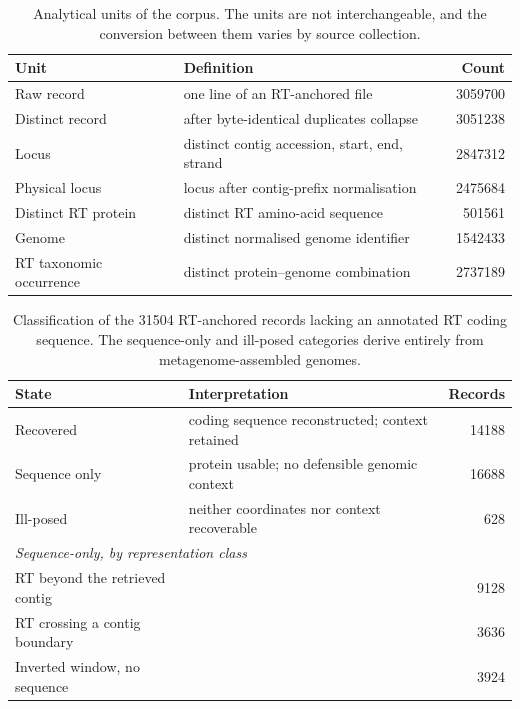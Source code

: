 \begin{table}[htbp]
\centering
\caption[Analytical units of the corpus]{Analytical units of the corpus. The units are not
interchangeable, and the conversion between them varies by source collection.}
\label{tab:units}
\begin{tabular}{llr}
\toprule
Unit & Definition & Count \\
\midrule
Raw record              & one line of an RT-anchored file                      & \num{3059700} \\
Distinct record         & after byte-identical duplicates collapse             & \num{3051238} \\
Locus                   & distinct contig accession, start, end, strand        & \num{2847312} \\
Physical locus          & locus after contig-prefix normalisation              & \num{2475684} \\
Distinct RT protein     & distinct RT amino-acid sequence                      & \num{501561}  \\
Genome                  & distinct normalised genome identifier                & \num{1542433} \\
RT taxonomic occurrence & distinct protein--genome combination                 & \num{2737189} \\
\bottomrule
\end{tabular}
\end{table}

\begin{table}[htbp]
\centering
\caption[Classification of records lacking an annotated RT coding sequence]{Classification of the
\num{31504} RT-anchored records lacking an annotated RT coding sequence. The sequence-only and
ill-posed categories derive entirely from metagenome-assembled genomes.}
\label{tab:recovery}
\begin{tabular}{llr}
\toprule
State & Interpretation & Records \\
\midrule
Recovered     & coding sequence reconstructed; context retained & \num{14188} \\
Sequence only & protein usable; no defensible genomic context   & \num{16688} \\
Ill-posed     & neither coordinates nor context recoverable     & 628 \\
\midrule
\multicolumn{2}{l}{\emph{Sequence-only, by representation class}} & \\
\quad RT beyond the retrieved contig      & & \num{9128} \\
\quad RT crossing a contig boundary       & & \num{3636} \\
\quad Inverted window, no sequence        & & \num{3924} \\
\bottomrule
\end{tabular}
\end{table}

